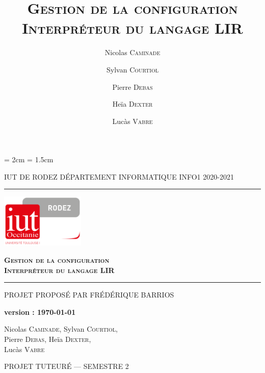 \documentclass[11pt,a4paper,titlepage,openright]{report}
\title{\textsc{\textbf{Gestion de la configuration\\Interpréteur du langage LIR}}}
\date{}
\author{Nicolas \textsc{Caminade} \and Sylvan \textsc{Courtiol} \and Pierre \textsc{Debas} \and Heïa \textsc{Dexter} \and Lucàs \textsc{Vabre} }
\begin{document}

    \cfoot{\thepage}
    \headheight = 2cm
    \headsep = 1.5cm


    \begin{titlepage}
        \selectfont

        \begin{center}\normalsize
            \MakeUppercase{IUT de Rodez \hfill Département informatique \hfill INFO1 2020-2021}
        \end{center}
        \vspace*{0.1cm}
        \hrule
        \vspace*{0.2cm}
        \begin{flushright}
            \includegraphics[width=4cm]{img/logoiut}
        \end{flushright}
        \vspace*{2cm}
        \begin{flushright}\Huge
            \textsc{\textbf{Gestion de la configuration\\Interpréteur du langage LIR}}
        \end{flushright}
        \hrule
        \begin{flushleft}
            \MakeUppercase{Projet proposé par Frédérique Barrios}
        \end{flushleft}
        \vspace*{1cm}
        \begin{center}\normalsize
        	\textbf{version : \today}
        \end{center}
        \vspace*{1cm}
        \begin{center}\Large
            Nicolas \textsc{Caminade}, Sylvan \textsc{Courtiol},\\
            Pierre \textsc{Debas}, Heïa \textsc{Dexter}, \\
            Lucàs \textsc{Vabre}
        \end{center}
        \vfill
        \begin{center}\normalsize
            \MakeUppercase{Projet tuteuré --- Semestre 2}
        \end{center}
    \end{titlepage}
\end{document}
